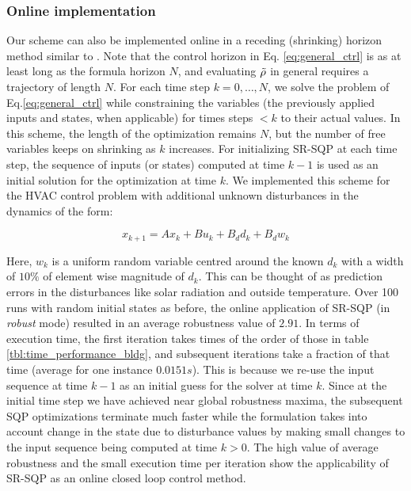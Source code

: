 \subsubsection{Online implementation} 
Our scheme can also be implemented online in a receding (shrinking) horizon method similar to \cite{Raman14_MPCSTL}. Note that the control horizon in Eq. \ref{eq:general_ctrl} is as at least long as the formula horizon $N$, and evaluating $\tilde{\rho}$ in general requires a trajectory of length $N$. 
For each time step $k=0,\dotsc,N$, we solve the problem of Eq.\ref{eq:general_ctrl} while constraining the variables (the previously applied inputs and states, when applicable) for times steps $<k$ to their actual values. In this scheme, the length of the optimization remains $N$, but the number of free variables keeps on shrinking as $k$ increases. For initializing SR-SQP at each time step, the sequence of inputs (or states) computed at time $k-1$ is used as an initial solution for the optimization at time $k$. 
We implemented this scheme for the HVAC control problem with additional unknown disturbances in the dynamics of the form:
  
\begin{equation}
\label{eq:bldg_dyn_noisy}
x_{k+1} = Ax_{k}+Bu_k+B_dd_k+B_dw_k
\end{equation}

Here, $w_k$ is a uniform random variable centred around the known $d_k$ with a width of $10\%$ of element wise magnitude of $d_k$. This can be thought of as prediction errors in the disturbances like solar radiation and outside temperature. Over 100 runs with random initial states as before, the online application of SR-SQP (in \textit{robust} mode) resulted in an average robustness value of $2.91$. In terms of execution time, the first iteration takes times of the order of those in table \ref{tbl:time_performance_bldg}, and subsequent iterations take a fraction of that time (average for one instance $0.0151s$). This is because we re-use the input sequence at time $k-1$ as an initial guess for the solver at time $k$. Since at the initial time step we have achieved near global robustness maxima, the subsequent SQP optimizations terminate much faster while the formulation takes into account change in the state due to disturbance values by making small changes to the input sequence being computed at time $k>0$. The high value of average robustness and the small execution time per iteration show the applicability of SR-SQP as an online closed loop control method. 

